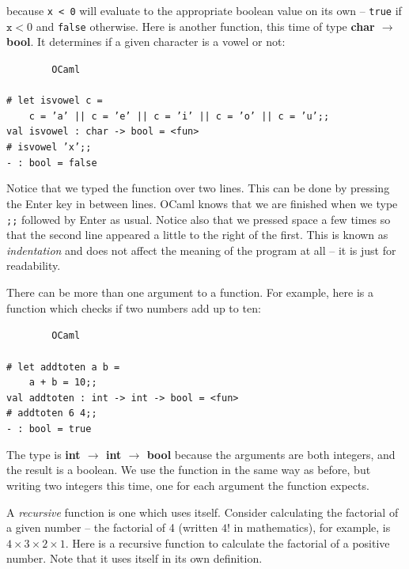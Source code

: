 \documentclass[]{book}
\newcommand{\smspace}{\vspace{4mm}}
\begin{document}
\noindent because \texttt{x < 0} will evaluate to the appropriate boolean value on its own -- \texttt{true} if $\texttt{x} < 0$ and \texttt{false} otherwise. Here is another function, this time of type \textbf{\textsf{char $\rightarrow$ bool}}. It determines if a given character is a vowel or not:

\smspace
\noindent\verb!        OCaml!\\
\noindent\\
\noindent\verb!# let isvowel c =!\\
\noindent\mbox{\texttt{~~~~c = 'a' || c = 'e' || c = 'i' || c = 'o' || c = 'u';;}}\\
\noindent\verb!val isvowel : char -> bool = <fun>!\\
\noindent\texttt{\# isvowel 'x';;}\\
\noindent\verb!- : bool = false!
\smspace

\noindent Notice that we typed the function over two lines. This can be done by pressing the Enter key in between lines. OCaml knows that we are finished when we type \texttt{;;} followed by Enter as usual. Notice also that we pressed space a few times so that the second line appeared a little to the right of the first. This is known as \textit{indentation} and does not affect the meaning of the program at all -- it is just for readability.

There can be more than one argument to a function. For example, here is a function which checks if two numbers add up to ten:

\smspace
\noindent\verb!        OCaml!\\
\noindent\\
\noindent\verb!# let addtoten a b =!\\
\noindent\verb!    a + b = 10;;!\\
\noindent\verb!val addtoten : int -> int -> bool = <fun>!\\
\noindent\texttt{\# addtoten 6 4;;}\\
\noindent\verb!- : bool = true!
\smspace

\noindent The type is \textsf{\textbf{int $\rightarrow$ int $\rightarrow$ bool}} because the arguments are both integers, and the result is a boolean. We use the function in the same way as before, but writing two integers this time, one for each argument the function expects.

A \textit{recursive} function is one which uses itself. Consider calculating the factorial of a given number -- the factorial of 4 (written $4!$ in mathematics), for example, is $4\times3\times2\times1$. Here is a recursive function to calculate the factorial of a positive number. Note that it uses itself in its own definition.
\end{document}
